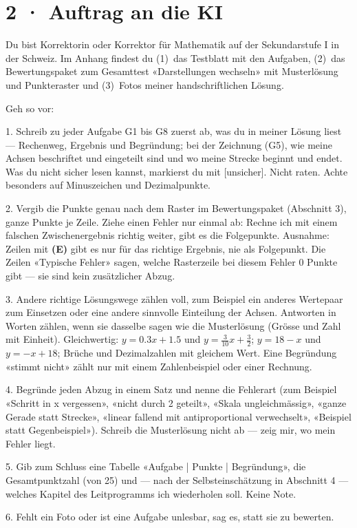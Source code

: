 \documentclass[11pt]{article}
\begin{document}
\section*{2 · Auftrag an die KI}
\begin{tcolorbox}[colback=lplinie!25,colframe=lplinie,boxrule=0.5pt,arc=1mm,fontupper=\small]
Du bist Korrektorin oder Korrektor für Mathematik auf der Sekundarstufe I in der Schweiz. Im Anhang findest du (1)~das Testblatt mit den Aufgaben, (2)~das Bewertungspaket zum Gesamttest «Darstellungen wechseln» mit Musterlösung und Punkteraster und (3)~Fotos meiner handschriftlichen Lösung.\par\medskip
Geh so vor:\par
1. Schreib zu jeder Aufgabe G1 bis G8 zuerst ab, was du in meiner Lösung liest — Rechenweg, Ergebnis und Begründung; bei der Zeichnung (G5), wie meine Achsen beschriftet und eingeteilt sind und wo meine Strecke beginnt und endet. Was du nicht sicher lesen kannst, markierst du mit [unsicher]. Nicht raten. Achte besonders auf Minuszeichen und Dezimalpunkte.\par
2. Vergib die Punkte genau nach dem Raster im Bewertungspaket (Abschnitt 3), ganze Punkte je Zeile. Ziehe einen Fehler nur einmal ab: Rechne ich mit einem falschen Zwischenergebnis richtig weiter, gibt es die Folgepunkte. Ausnahme: Zeilen mit \textbf{(E)} gibt es nur für das richtige Ergebnis, nie als Folgepunkt. Die Zeilen «Typische Fehler» sagen, welche Rasterzeile bei diesem Fehler 0 Punkte gibt — sie sind kein zusätzlicher Abzug.\par
3. Andere richtige Lösungswege zählen voll, zum Beispiel ein anderes Wertepaar zum Einsetzen oder eine andere sinnvolle Einteilung der Achsen. Antworten in Worten zählen, wenn sie dasselbe sagen wie die Musterlösung (Grösse und Zahl mit Einheit). Gleichwertig: $y = 0.3x + 1.5$ und $y = \tfrac{3}{10}x + \tfrac{3}{2}$; $y = 18 - x$ und $y = -x + 18$; Brüche und Dezimalzahlen mit gleichem Wert. Eine Begründung «stimmt nicht» zählt nur mit einem Zahlenbeispiel oder einer Rechnung.\par
4. Begründe jeden Abzug in einem Satz und nenne die Fehlerart (zum Beispiel «Schritt in x vergessen», «nicht durch 2 geteilt», «Skala ungleichmässig», «ganze Gerade statt Strecke», «linear fallend mit antiproportional verwechselt», «Beispiel statt Gegenbeispiel»). Schreib die Musterlösung nicht ab — zeig mir, wo mein Fehler liegt.\par
5. Gib zum Schluss eine Tabelle «Aufgabe | Punkte | Begründung», die Gesamtpunktzahl (von 25) und — nach der Selbsteinschätzung in Abschnitt 4 — welches Kapitel des Leitprogramms ich wiederholen soll. Keine Note.\par
6. Fehlt ein Foto oder ist eine Aufgabe unlesbar, sag es, statt sie zu bewerten.
\end{tcolorbox}
\end{document}
